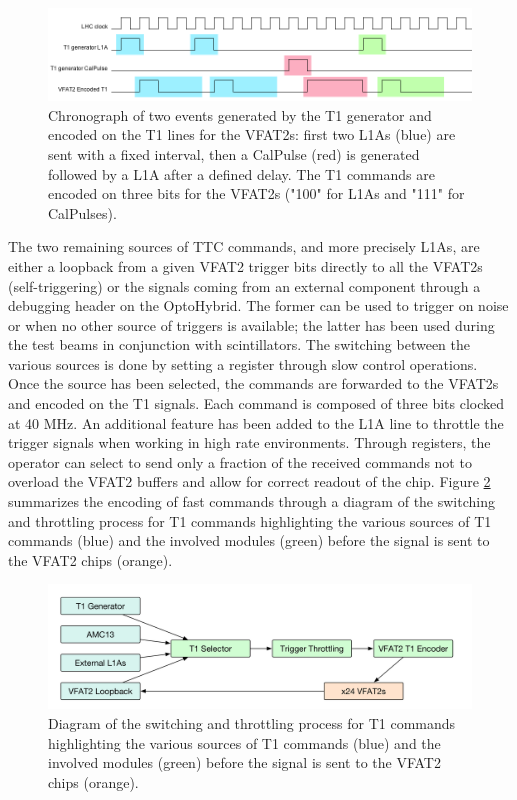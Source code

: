      \begin{figure}[h!]
        \centering
        \includegraphics[width=\textwidth]{img/II-3-test-beam/t1-chrono.png}
        \caption{Chronograph of two events generated by the T1 generator and encoded on the T1 lines for the VFAT2s: first two L1As (blue) are sent with a fixed interval, then a CalPulse (red) is generated followed by a L1A after a defined delay. The T1 commands are encoded on three bits for the VFAT2s ("100" for L1As and "111" for CalPulses).}
        \label{fig:II-3-t1-chrono}
      \end{figure}

      The two remaining sources of TTC commands, and more precisely L1As, are either a loopback from a given VFAT2 trigger bits directly to all the VFAT2s (self-triggering) or the signals coming from an external component through a debugging header on the OptoHybrid. The former can be used to trigger on noise or when no other source of triggers is available; the latter has been used during the test beams in conjunction with scintillators. The switching between the various sources is done by setting a register through slow control operations. Once the source has been selected, the commands are forwarded to the VFAT2s and encoded on the T1 signals. Each command is composed of three bits clocked at 40 MHz. An additional feature has been added to the L1A line to throttle the trigger signals when working in high rate environments. Through registers, the operator can select to send only a fraction of the received commands not to overload the VFAT2 buffers and allow for correct readout of the chip. Figure \ref{fig:II-3-t1-switch} summarizes the encoding of fast commands through a diagram of the switching and throttling process for T1 commands highlighting the various sources of T1 commands (blue) and the involved modules (green) before the signal is sent to the VFAT2 chips (orange).

      \begin{figure}[h!]
        \centering
        \includegraphics[width=\textwidth]{img/II-3-test-beam/t1-switch}
        \caption{Diagram of the switching and throttling process for T1 commands highlighting the various sources of T1 commands (blue) and the involved modules (green) before the signal is sent to the VFAT2 chips (orange).}
        \label{fig:II-3-t1-switch}
      \end{figure}

